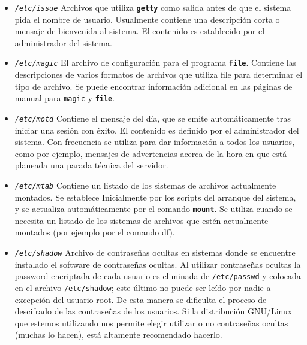 \begin{itemize}
	\item \textit{\texttt{/etc/issue}}
	 Archivos que utiliza \texttt{\textbf{getty}} como
	salida antes de que el sistema pida el nombre de usuario. Usualmente
	contiene una descripción corta o mensaje de bienvenida al sistema.  El
	contenido es establecido por el administrador del sistema.
	


	\item \textit{\texttt{/etc/magic}}
	 El archivo de configuración para el programa
	\texttt{\textbf{file}}. Contiene las descripciones de varios formatos
	de archivos que utiliza file para determinar el tipo de archivo. Se
	puede encontrar información adicional en las páginas de manual
	para \texttt{magic} y \texttt{\textbf{file}}.
	


	\item \textit{\texttt{/etc/motd}}
	 Contiene el mensaje del día, que se emite
	automáticamente  		tras iniciar una sesión con éxito. El
	contenido 	es definido por el 		administrador del
	sistema. Con frecuencia se utiliza para dar información a 	todos
	los usuarios, como por ejemplo, mensajes de advertencias acerca de la
	hora en que está planeada una parada técnica del servidor.
	


	\item \textit{\texttt{/etc/mtab}}
	 Contiene un listado de los sistemas de archivos
	actualmente montados. Se establece Inicialmente por los scripts del
	arranque del sistema, y se actualiza automáticamente por el comando
	\texttt{\textbf{mount}}. Se utiliza cuando se necesita un listado de
	los sistemas de archivos que estén actualmente montados (por ejemplo por
	el comando df).  


	\item \textit{\texttt{/etc/shadow}}
	 Archivo de contraseñas ocultas en sistemas donde se
	encuentre instalado el software de contraseñas ocultas.  Al utilizar
	contraseñas ocultas la password encriptada de cada usuario es eliminada
	de \texttt{/etc/passwd} y colocada en el archivo
	\texttt{/etc/shadow}; este último no 		puede
	ser leído por nadie a excepción del usuario root. De esta manera se
	dificulta el proceso de descifrado de las contraseñas de los usuarios.
	Si 		la distribución GNU/Linux que estemos utilizando nos
	permite elegir 			utilizar o no contraseñas ocultas
	(muchas lo hacen), está altamente 			recomendado
	hacerlo.  


	


\end{itemize}
